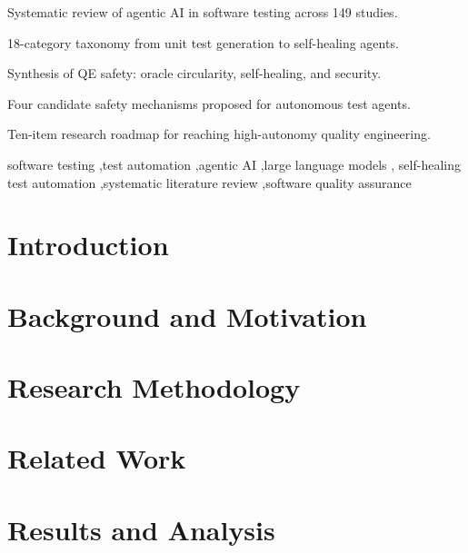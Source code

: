 \documentclass[a4paper,fleqn,review,12pt]{cas-sc}
\begin{document}
\begin{highlights}
\item Systematic review of agentic AI in software testing across 149 studies.
\item 18-category taxonomy from unit test generation to self-healing agents.
\item Synthesis of QE safety: oracle circularity, self-healing, and security.
\item Four candidate safety mechanisms proposed for autonomous test agents.
\item Ten-item research roadmap for reaching high-autonomy quality engineering.
\end{highlights}

\begin{keywords}
software testing \sep test automation \sep agentic AI \sep large language models \sep
self-healing test automation \sep systematic literature review \sep software quality assurance
\end{keywords}

\maketitle

\section{Introduction}
\label{sec:introduction}


\section{Background and Motivation}
\label{sec:background}


\section{Research Methodology}
\label{sec:methodology}


\section{Related Work}
\label{sec:related-work}


\section{Results and Analysis}
\label{sec:results}

\end{document}
